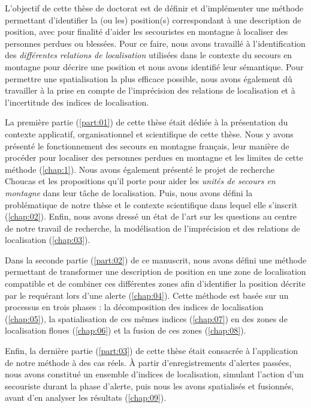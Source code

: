L'objectif de cette thèse de doctorat est de définir et d'implémenter
une méthode permettant d'identifier la (ou les) position(s)
correspondant à une description de position, avec pour finalité
d'aider les secouristes en montagne à localiser des personnes perdues
ou blessées. Pour ce faire, nous avons travaillé à l'identification
des \emph{différentes relations de localisation} utilisées dans le
contexte du secours en montagne pour décrire une position et nous
avons identifié leur sémantique. Pour permettre une spatialisation la
plus efficace possible, nous avons également dû travailler à la prise
en compte de l'imprécision des relations de localisation et à
l'incertitude des indices de localisation.

La première partie (\ref{part:01}) de cette thèse était dédiée à la
présentation du contexte applicatif, organisationnel et scientifique
de cette thèse. Nous y avons présenté le fonctionnement des secours en
montagne français, leur manière de procéder pour localiser des
personnes perdues en montagne et les limites de cette méthode
(\autoref{chap:1}). Nous avons également présenté le projet de
recherche Choucas et les propositions qu'il porte pour aider les
\emph{unités de secours en montagne} dans leur tâche de
localisation. Puis, nous avons défini la problématique de notre thèse
et le contexte scientifique dans lequel elle s'inscrit
(\autoref{chap:02}). Enfin, nous avons dressé un état de l'art sur les
questions au centre de notre travail de recherche, la modélisation de
l'imprécision et des relations de localisation (\autoref{chap:03}).

Dans la seconde partie (\ref{part:02}) de ce manuscrit, nous avons
défini une méthode permettant de transformer une description de
position en une zone de localisation compatible et de combiner ces
différentes zones afin d’identifier la position décrite par le
requérant lors d'une alerte (\autoref{chap:04}). Cette méthode est
basée sur un processus en trois phases : la décomposition des indices
de localisation (\autoref{chap:05}), la spatialisation de ces mêmes
indices (\autoref{chap:07}) en des zones de localisation floues
(\autoref{chap:06}) et la fusion de ces zones (\autoref{chap:08}).

Enfin, la dernière partie (\ref{part:03}) de cette thèse était
consacrée à l’application de notre méthode à des cas réels. À partir
d'enregistrements d'alertes passées, nous avons constitué un ensemble
d'indices de localisation, simulant l'action d'un secouriste durant la
phase d'alerte, puis nous les avons spatialisés et fusionnés, avant
d'en analyser les résultats (\autoref{chap:09}).

